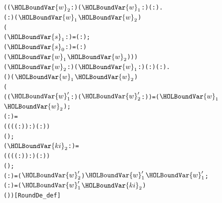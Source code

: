 \documentclass{article}
\begin{document}
\begin{alltt}
\HOLTokenTurnstile{} (\HOLSymConst{\HOLTokenForall{}}(\ensuremath{\HOLBoundVar{w}\sb{\mathrm{2}}} :) (\ensuremath{\HOLBoundVar{w}\sb{\mathrm{1}}} :) ( : ).
       ( :)  (\ensuremath{\HOLBoundVar{w}\sb{\mathrm{1}}}\HOLSymConst{,}\ensuremath{\HOLBoundVar{w}\sb{\mathrm{2}}}) \HOLSymConst{=}
      (
         (\ensuremath{\HOLBoundVar{s}\sb{\mathrm{1}}} :) =  ( :) ;
         (\ensuremath{\HOLBoundVar{s}\sb{\mathrm{0}}} :) =  ( :) 
         (\ensuremath{\HOLBoundVar{w}\sb{\mathrm{1}}}\HOLSymConst{,}\ensuremath{\HOLBoundVar{w}\sb{\mathrm{2}}}))) \HOLSymConst{\HOLTokenConj{}}
   \HOLSymConst{\HOLTokenForall{}}(\ensuremath{\HOLBoundVar{w}\sb{\mathrm{2}}} :) (\ensuremath{\HOLBoundVar{w}\sb{\mathrm{1}}} :) ( :) ( : ).
      ( )  (\ensuremath{\HOLBoundVar{w}\sb{\mathrm{1}}}\HOLSymConst{,}\ensuremath{\HOLBoundVar{w}\sb{\mathrm{2}}}) \HOLSymConst{=}
     (
        ((\ensuremath{\HOLBoundVar{w}\sb{\mathrm{1}}\sp{\prime{}}} :)\HOLSymConst{,}(\ensuremath{\HOLBoundVar{w}\sb{\mathrm{2}}\sp{\prime{}}} :)) =    (\ensuremath{\HOLBoundVar{w}\sb{\mathrm{1}}}\HOLSymConst{,}\ensuremath{\HOLBoundVar{w}\sb{\mathrm{2}}});
        ( :) =
           (((( :) \HOLSymConst{\HOLTokenProd{}}  ) :) \HOLSymConst{\ensuremath{-}} ( :))
            ( );
        (\ensuremath{\HOLBoundVar{ki}\sb{\mathrm{2}}} :) =
           (((( :) \HOLSymConst{\HOLTokenProd{}}  ) :) \HOLSymConst{\ensuremath{-}} ( :))
            ( );
        ( :) = (\ensuremath{\HOLBoundVar{w}\sb{\mathrm{2}}\sp{\prime{}}} \HOLSymConst{\ensuremath{-}} ) \HOLSymConst{\HOLTokenRor{}}  \ensuremath{\HOLBoundVar{w}\sb{\mathrm{1}}\sp{\prime{}}} \HOLSymConst{\HOLTokenEor{}} \ensuremath{\HOLBoundVar{w}\sb{\mathrm{1}}\sp{\prime{}}};
        ( :) = (\ensuremath{\HOLBoundVar{w}\sb{\mathrm{1}}\sp{\prime{}}} \HOLSymConst{\ensuremath{-}} \ensuremath{\HOLBoundVar{ki}\sb{\mathrm{2}}}) \HOLSymConst{\HOLTokenRor{}}   \HOLSymConst{\HOLTokenEor{}} 
        (\HOLSymConst{,}))\hfill{[RoundDe_def]}
\end{alltt}
\end{document}
